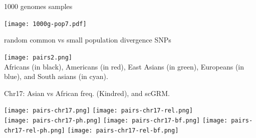 \documentclass[]{beamer}
\begin{document}
\begin{frame}{1000 genomes samples}
\begin{center}
\texttt{[image: 1000g-pop7.pdf]}
\end{center}
\end{frame}


\begin{frame}{random common vs small population divergence SNPs}
\begin{center}
\texttt{[image: pairs2.png]}\\
\vspace{-0.05in}
{\tiny Africans (in black), Americans (in red), East Asians (in green), Europeans (in blue), and South asians (in cyan).}
\end{center}
\end{frame}

\begin{frame}{Chr17: Asian vs African freq. (Kindred), and scGRM.}
\begin{center}
\texttt{[image: pairs-chr17.png]}
\texttt{[image: pairs-chr17-rel.png]}\\
\texttt{[image: pairs-chr17-ph.png]} 
\texttt{[image: pairs-chr17-bf.png]} 
\texttt{[image: pairs-chr17-rel-ph.png]} 
\texttt{[image: pairs-chr17-rel-bf.png]}
\end{center}

\end{frame}
\end{document}
